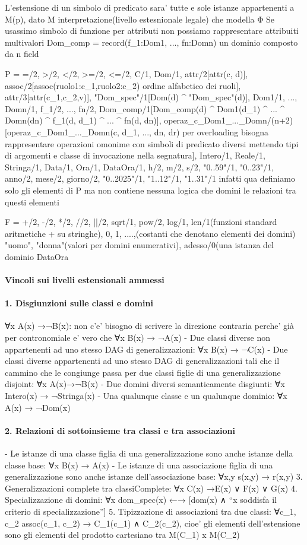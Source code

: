 \documentclass[12pt]{article}
\begin{document}
	L'estensione di un simbolo di predicato sara' tutte e sole istanze appartenenti a M(p), dato M interpretazione(livello estesnionale legale) che modella Φ
	Se usassimo simbolo di funzione per attributi non possiamo rappresentare attribuiti multivalori
	Dom_comp = record(f_1:Dom1, ..., fn:Domn) un dominio composto da n field

	P = {=/2, >/2, </2, >=/2, <=/2, C/1, Dom/1, attr/2[attr(c, d)], assoc/2[assoc(ruolo1:c_1,ruolo2:c_2) ordine alfabetico dei ruoli], attr/3[attr(c_1,c_2,v)], "Dom_spec"/1[Dom(d) ^ "Dom_spec"(d)], Dom1/1, ..., Domn/1, f_1/2, ..., fn/2,  Dom_comp/1[Dom_comp(d) ^ Dom1(d_1) ^ ... ^ Domn(dn) ^ f_1(d, d_1) ^ ... ^ fn(d, 	dn)], operaz_c_Dom1_..._Domn/(n+2)[operaz_c_Dom1_..._Domn(c, d_1, ..., dn, dr) per overloading bisogna rappresentare operazioni omonime con simboli di predicato diversi mettendo tipi di argomenti e classe di invocazione nella segnatura], Intero/1, Reale/1, Stringa/1, Data/1, Ora/1, DataOra/1, h/2, m/2, s/2, "0..59"/1, "0..23"/1, anno/2, mese/2, giorno/2, "0..2025"/1, "1..12"/1, "1..31"/1} 
infatti qua definiamo solo gli elementi di P ma non contiene nessuna logica che domini le relazioni tra questi elementi


	F = {+/2, -/2, */2, //2, ||/2, sqrt/1, pow/2, log/1, len/1(funzioni standard aritmetiche + su stringhe), 0, 1, ....,(costanti che denotano elementi dei domini) "uomo", "donna"(valori per domini enumerativi), adesso/0(una istanza del dominio DataOra}

\paragraph{Vincoli sui livelli estensionali ammessi}
\paragraph{1. Disgiunzioni sulle classi e domini}
∀x A(x) →¬B(x):  non c'e' bisogno di scrivere la direzione contraria perche' già per contronomiale e' vero che ∀x B(x) → ¬A(x)
	- Due classi diverse non appartenenti ad uno stesso DAG di generalizzazioni: ∀x B(x) → ¬C(x)
	- Due classi diverse appartenenti ad uno stesso DAG di generalizzazioni tali che il cammino che le congiunge passa per due classi figlie di una generalizzazione {disjoint}: ∀x A(x)→¬B(x)
	- Due domini diversi semanticamente disgiunti: ∀x Intero(x) → ¬Stringa(x)
	- Una qualunque classe e un qualunque dominio: ∀x A(x) → ¬Dom(x)
\paragraph{2. Relazioni di sottoinsieme tra classi e tra associazioni}
	- Le istanze di una classe figlia di una generalizzazione sono anche istanze della classe base: ∀x B(x) → A(x)
	- Le istanze di una associazione figlia di una generalizzazione sono anche istanze dell’associazione base: ∀x,y s(x,y) → r(x,y)
3. Generalizzazioni complete tra classi{Complete}: ∀x C(x) →E(x) ∨ F(x) ∨ G(x)
4. Specializzazione di domini: ∀x dom_spec(x) ←→ [dom(x) ∧ “x soddisfa il criterio di specializzazione”]
5. Tipizzazione di associazioni tra due classi: ∀c_1, c_2 assoc(c_1, c_2) → C_1(c_1) ∧ C_2(c_2), cioe' gli elementi dell'estensione sono gli elementi del prodotto cartesiano tra M(C_1) x M(C_2)
\end{document}

